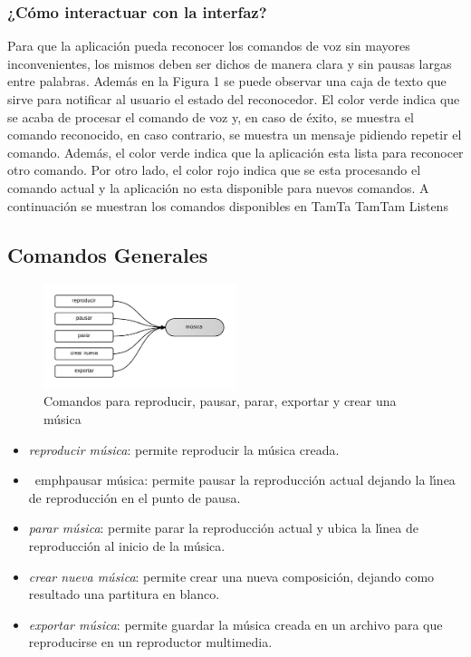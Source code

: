 \subsubsection{¿C\'omo interactuar con la interfaz?}
Para que la aplicaci\'on pueda reconocer los comandos de voz sin mayores inconvenientes, los mismos
deben ser dichos de manera clara y sin pausas largas entre palabras. Adem\'as en la Figura 1 se puede
observar una caja de texto que sirve para notificar al usuario el estado del reconocedor. El color verde
indica que se acaba de procesar el comando  de voz   y,  en caso de  \'exito, se muestra el comando
reconocido, en caso contrario, se muestra un mensaje pidiendo repetir el comando.  Adem\'as, el color
verde indica que la aplicaci\'on esta lista para reconocer otro comando. Por otro lado, el color rojo indica
que se esta procesando el comando actual y la aplicaci\'on no esta disponible para nuevos comandos.
A continuaci\'on se muestran los comandos disponibles en TamTa TamTam Listens

\subsection{Comandos Generales}

\begin{figure}[H] 
\centering
\includegraphics[width=0.5\textwidth]{./graphics/cmd-musica.png}
\caption{Comandos para reproducir, pausar, parar, exportar y crear una m\'usica}
\label{figure:cmd-crear-musica-anexo}
\end{figure}

\begin{itemize}
\item \emph{reproducir m\'usica}: permite reproducir la m\'usica creada.
\item \ emph{pausar m\'usica}: permite pausar la reproducci\'on actual dejando la l{\'\i}nea de reproducci\'on en el
punto de pausa.
\item \emph{parar m\'usica}: permite parar la reproducci\'on actual y ubica la l{\'\i}nea de reproducci\'on al inicio de
la m\'usica.
\item \emph{crear nueva m\'usica}:  permite crear una nueva composici\'on, dejando como resultado una
partitura en blanco.
\item \emph{exportar m\'usica}: permite guardar la m\'usica creada en un archivo para que reproducirse en un
reproductor multimedia.
\end{itemize}

